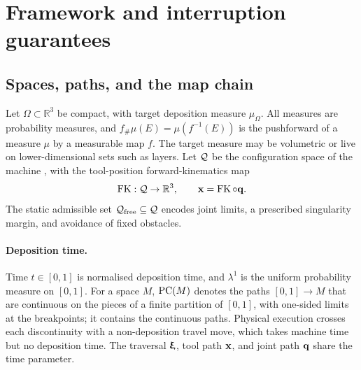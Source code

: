 \section{Framework and interruption guarantees}
\label{sec:cms}

\subsection{Spaces, paths, and the map chain}
\label{sec:cms-spaces}

Let $\Omega\subset\mathbb{R}^3$ be compact, with target deposition measure $\mu_\Omega$. All measures are probability measures, and $f_\#\mu(E)=\mu(f^{-1}(E))$ is the pushforward of a measure $\mu$ by a measurable map $f$. The target measure may be volumetric or live on lower-dimensional sets such as layers. Let $\mathcal{Q}$ be the configuration space of the machine \cite{lavalle2006}, with the tool-position forward-kinematics map
\begin{equation}
  \label{eq:cms-forward-kinematics}
  \operatorname{FK}:\mathcal{Q}\to\mathbb{R}^3,\qquad {\bm{\mathrm{x}}}=\operatorname{FK}\circ {\bm{\mathrm{q}}}.
\end{equation}
The static admissible set $\mathcal{Q}_{\mathrm{free}}\subseteq\mathcal{Q}$ encodes joint limits, a prescribed singularity margin, and avoidance of fixed obstacles.

\paragraph{Deposition time.}
Time $t\in[0,1]$ is normalised deposition time, and $\lambda^1$ is the uniform probability measure on $[0,1]$. For a space $M$, $\operatorname{PC}(M)$ denotes the paths $[0,1]\to M$ that are continuous on the pieces of a finite partition of $[0,1]$, with one-sided limits at the breakpoints; it contains the continuous paths. Physical execution crosses each discontinuity with a non-deposition travel move, which takes machine time but no deposition time. The traversal ${\bm{\mathrm{\upxi}}}$, tool path ${\bm{\mathrm{x}}}$, and joint path ${\bm{\mathrm{q}}}$ share the time parameter.

